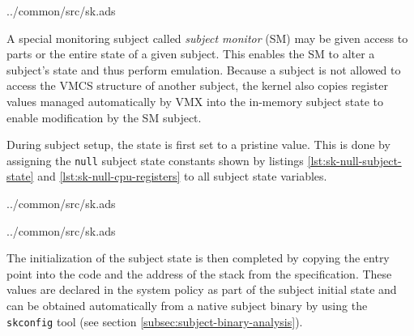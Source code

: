 
	{../common/src/sk.ads}

A special monitoring subject called \emph{subject monitor} (SM) may be given access to parts or the entire state of a
given subject. This enables the SM to alter a subject's state and thus perform
emulation. Because a subject is not allowed to access the VMCS structure of
another subject, the kernel also copies register values managed automatically by
VMX into the in-memory subject state to enable modification by the SM
subject.

During subject setup, the state is first set to a pristine value. This is done
by assigning the \texttt{null} subject state constants shown by listings
\ref{lst:sk-null-subject-state} and \ref{lst:sk-null-cpu-registers} to all
subject state variables.


	{../common/src/sk.ads}


	{../common/src/sk.ads}

The initialization of the subject state is then completed by copying the entry
point into the code and the address of the stack from the specification.  These
values are declared in the system policy as part of the subject initial state
and can be obtained automatically from a native subject binary by using the
\texttt{skconfig} tool (see section \ref{subsec:subject-binary-analysis}).
